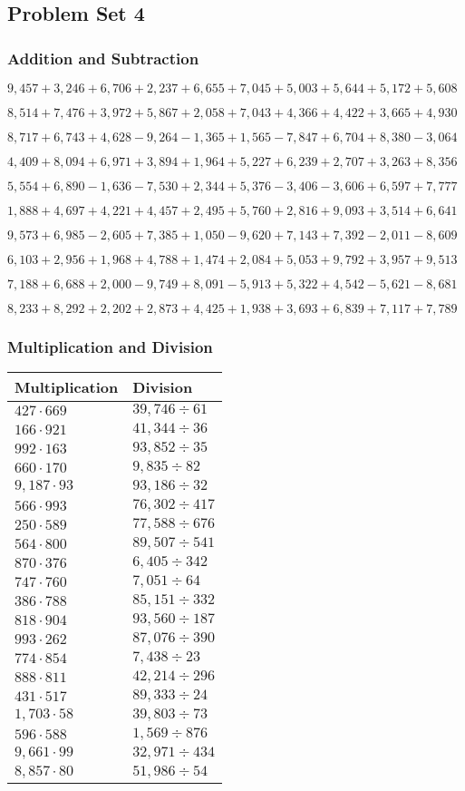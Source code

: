 \hypertarget{problem-set-4-3}{%
\subsection{Problem Set 4}\label{problem-set-4-3}}

\hypertarget{addition-and-subtraction-166}{%
\subsubsection{Addition and
Subtraction}\label{addition-and-subtraction-166}}

\(9,457+3,246+6,706+2,237+6,655+7,045+5,003+5,644+5,172+ 5,608\)

\(8,514+7,476+3,972+5,867+2,058+7,043+4,366+4,422+3,665+4,930\)

\(8,717+6,743+4,628-9,264-1,365+1,565-7,847+6,704+8,380-3,064\)

\(4,409+8,094+6,971+3,894+1,964+5,227+6,239+2,707+3,263+8,356\)

\(5,554+6,890-1,636-7,530+2,344+5,376-3,406-3,606+6,597+7,777\)

\(1,888+4,697+4,221+4,457+2,495+5,760+2,816+9,093+3,514+6,641\)

\(9,573+6,985-2,605+7,385+1,050-9,620+7,143+7,392-2,011-8,609\)

\(6,103+2,956+1,968+4,788+1,474+2,084+5,053+9,792+3,957+9,513\)

\(7,188+6,688+2,000-9,749+8,091-5,913+5,322+4,542-5,621-8,681\)

\(8,233+8,292+2,202+2,873+4,425+1,938+3,693+6,839+7,117+7,789\)

\hypertarget{multiplication-and-division-165}{%
\subsubsection{Multiplication and
Division}\label{multiplication-and-division-165}}

\begin{longtable}[]{@{}ll@{}}
\toprule
Multiplication & Division\tabularnewline
\midrule
\endhead
\(427\cdot669\) & \(39,746÷61\)\tabularnewline
\(166\cdot921\) & \(41,344÷36\)\tabularnewline
\(992\cdot163\) & \(93,852÷35\)\tabularnewline
\(660\cdot170\) & \(9,835÷82\)\tabularnewline
\(9,187\cdot93\) & \(93,186÷32\)\tabularnewline
\(566\cdot993\) & \(76,302÷417\)\tabularnewline
\(250\cdot589\) & \(77,588÷676\)\tabularnewline
\(564\cdot800\) & \(89,507÷541\)\tabularnewline
\(870\cdot376\) & \(6,405÷342\)\tabularnewline
\(747\cdot760\) & \(7,051÷64\)\tabularnewline
\(386\cdot788\) & \(85,151÷332\)\tabularnewline
\(818\cdot904\) & \(93,560÷187\)\tabularnewline
\(993\cdot262\) & \(87,076÷390\)\tabularnewline
\(774\cdot854\) & \(7,438÷23\)\tabularnewline
\(888\cdot811\) & \(42,214÷296\)\tabularnewline
\(431\cdot517\) & \(89,333÷24\)\tabularnewline
\(1,703\cdot58\) & \(39,803÷73\)\tabularnewline
\(596\cdot588\) & \(1,569÷876\)\tabularnewline
\(9,661\cdot99\) & \(32,971÷434\)\tabularnewline
\(8,857\cdot80\) & \(51,986÷54\)\tabularnewline
\bottomrule
\end{longtable}

